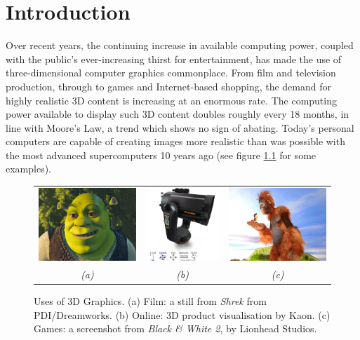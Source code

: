 \chapter{\label{sec:introduction}Introduction}

Over recent years, the continuing increase in available computing power, coupled with the public's ever-increasing thirst for entertainment, has made the use of three-dimensional computer graphics commonplace. From film and television production, through to games and Internet-based shopping, the demand for highly realistic 3D content is increasing at an enormous rate. The computing power available to display such 3D content doubles roughly every 18 months, in line with Moore's Law, a trend which shows no sign of abating. Today's personal computers are capable of creating images more realistic than was possible with the most advanced supercomputers 10 years ago (see figure \ref{fig:3dgraphics} for some examples).

\begin{figure}
\begin{center}
\begin{tabular}{ccc}
\includegraphics[width=4.7cm]{../images/shrek} &
\includegraphics[width=3.5cm]{../images/kaon} &
\includegraphics[width=4.7cm]{../images/black_white} \\
{\it (a)} & {\it (b)} & {\it (c)}
\end{tabular}
\caption[Uses of 3D Graphics]{\label{fig:3dgraphics} Uses of 3D Graphics. (a) Film: a still from {\it Shrek} from PDI/Dreamworks\cite{PDI}. (b) Online: 3D product visualisation by Kaon\cite{Kaon}. (c) Games: a screenshot from {\it Black \& White 2}, by Lionhead Studios\cite{Lionhead}.}
\end{center}
\end{figure}

